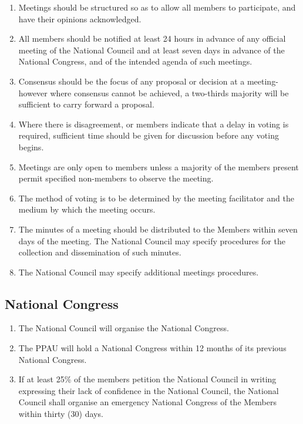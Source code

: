 \documentclass[a4paper,titlepage,8.5pt]{article}
\begin{document}
\begin{enumerate}
\item Meetings should be structured so as to allow all members to participate, and have their opinions acknowledged.
\item All members should be notified at least 24 hours in advance of any official meeting of the National Council and at least seven days in advance of the National Congress, and of the intended agenda of such meetings.
\item Consensus should be the focus of any proposal or decision at a meeting- however where consensus cannot be achieved, a two-thirds majority will be sufficient to carry forward a proposal.
\item Where there is disagreement, or members indicate that a delay in voting is required, sufficient time should be given for discussion before any voting begins.
\item Meetings are only open to members unless a majority of the members present permit specified non-members to observe the meeting.  
\item The method of voting is to be determined by the meeting facilitator and the medium by which the meeting occurs.
\item The minutes of a meeting should be distributed to the Members within seven days of the meeting. The National Council may specify procedures for the collection and dissemination of such minutes.
\item The National Council may specify additional meetings procedures. 
\end{enumerate}

\subsection{National Congress}

\begin{enumerate}
\item The National Council will organise the National Congress.
\item The PPAU will hold a National Congress within 12 months of its previous National Congress.
\item If at least 25\% of the members petition the National Council in writing expressing their lack of confidence in the National Council, the National Council shall organise an emergency National Congress of the Members within thirty (30) days. 
\end{enumerate}
\end{document}
